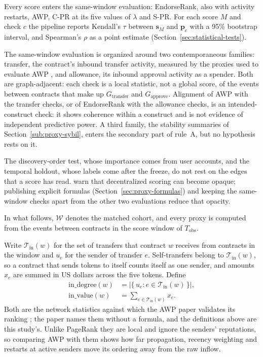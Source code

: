 
Every score enters the same-window evaluation: EndorseRank, also with activity restarts, AWP, \mbox{C-PR} at its five values of $\lambda$ and \mbox{S-PR}. For each score $M$ and check $c$ the pipeline reports Kendall's $\tau$ between $\mathbf{s}_M$ and $\mathbf{p}_c$ with a 95\% bootstrap interval, and Spearman's $\rho$ as a point estimate (Section~\ref{sec:statistical-tests}).

The same-window evaluation is organized around two contemporaneous families: transfer, the contract's inbound transfer activity, measured by the proxies used to evaluate AWP \parencite{do2023awp}, and allowance, its inbound approval activity as a spender. Both are graph-adjacent: each check is a local statistic, not a global score, of the events between contracts that make up $G_{\text{transfer}}$ and $G_{\text{approve}}$. Alignment of AWP with the transfer checks, or of EndorseRank with the allowance checks, is an intended-construct check: it shows coherence within a construct and is not evidence of independent predictive power. A third family, the stability summaries of Section~\ref{sub:proxy-sybil}, enters the secondary part of rule~A, but no hypothesis rests on it.

The discovery-order test, whose importance comes from user accounts, and the temporal holdout, whose labels come after the freeze, do not rest on the edges that a score has read. \textcite{packin2024credit} warn that decentralized scoring can become opaque; publishing explicit formulas (Section~\ref{sec:proxy-formulas}) and keeping the same-window checks apart from the other two evaluations reduce that opacity.


In what follows, $\mathcal{W}$ denotes the matched cohort, and every proxy is computed from the events between contracts in the score window of $T_{\mathrm{obs}}$.


Write $\mathcal{T}_{\mathrm{in}}(w)$ for the set of transfers that contract $w$ receives from contracts in the window and $u_e$ for the sender of transfer $e$. Self-transfers belong to $\mathcal{T}_{\mathrm{in}}(w)$, so a contract that sends tokens to itself counts itself as one sender, and amounts $x_e$ are summed in US dollars across the five tokens. Define
\begin{align}
\mathrm{in\_degree}(w)
&=
\bigl|\{\,u_e : e\in\mathcal{T}_{\mathrm{in}}(w)\,\}\bigr|,
\label{eq:in-degree}\\
\mathrm{in\_value}(w)
&=
\sum_{e\in\mathcal{T}_{\mathrm{in}}(w)} x_e.
\label{eq:in-value}
\end{align}
Both are the network statistics against which the AWP paper validates its ranking \parencite{do2023awp}; the paper names them without a formula, and the definitions above are this study's. Unlike PageRank they are local and ignore the senders' reputations, so comparing AWP with them shows how far propagation, recency weighting and restarts at active senders move its ordering away from the raw inflow.

